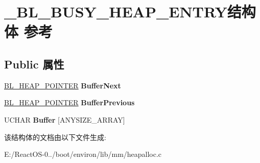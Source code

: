 \hypertarget{struct___b_l___b_u_s_y___h_e_a_p___e_n_t_r_y}{}\section{\+\_\+\+B\+L\+\_\+\+B\+U\+S\+Y\+\_\+\+H\+E\+A\+P\+\_\+\+E\+N\+T\+R\+Y结构体 参考}
\label{struct___b_l___b_u_s_y___h_e_a_p___e_n_t_r_y}
\subsection*{Public 属性}
\begin{DoxyCompactItemize}
\item 
\mbox{\label{struct___b_l___b_u_s_y___h_e_a_p___e_n_t_r_y_a92a577c3410e9ffe36025c8157d6fab1}} 
\hyperlink{struct___b_l___h_e_a_p___p_o_i_n_t_e_r}{B\+L\+\_\+\+H\+E\+A\+P\+\_\+\+P\+O\+I\+N\+T\+ER} {\bfseries Buffer\+Next}
\item 
\mbox{\label{struct___b_l___b_u_s_y___h_e_a_p___e_n_t_r_y_ae0583d86bb6b5f965e7f174932c1404c}} 
\hyperlink{struct___b_l___h_e_a_p___p_o_i_n_t_e_r}{B\+L\+\_\+\+H\+E\+A\+P\+\_\+\+P\+O\+I\+N\+T\+ER} {\bfseries Buffer\+Previous}
\item 
\mbox{\label{struct___b_l___b_u_s_y___h_e_a_p___e_n_t_r_y_a786823b374915e9ead13d79f7d4a8e4a}} 
U\+C\+H\+AR {\bfseries Buffer} \mbox{[}A\+N\+Y\+S\+I\+Z\+E\+\_\+\+A\+R\+R\+AY\mbox{]}
\end{DoxyCompactItemize}


该结构体的文档由以下文件生成\+:\begin{DoxyCompactItemize}
\item 
E\+:/\+React\+O\+S-\/0../boot/environ/lib/mm/heapalloc.\+c\end{DoxyCompactItemize}
